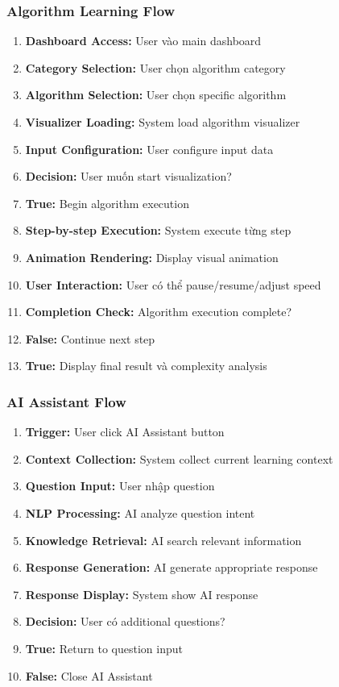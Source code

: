 \subsubsection{Algorithm Learning Flow}
\begin{enumerate}
    \item \textbf{Dashboard Access:} User vào main dashboard
    \item \textbf{Category Selection:} User chọn algorithm category
    \item \textbf{Algorithm Selection:} User chọn specific algorithm
    \item \textbf{Visualizer Loading:} System load algorithm visualizer
    \item \textbf{Input Configuration:} User configure input data
    \item \textbf{Decision:} User muốn start visualization?
    \item \textbf{True:} Begin algorithm execution
    \item \textbf{Step-by-step Execution:} System execute từng step
    \item \textbf{Animation Rendering:} Display visual animation
    \item \textbf{User Interaction:} User có thể pause/resume/adjust speed
    \item \textbf{Completion Check:} Algorithm execution complete?
    \item \textbf{False:} Continue next step
    \item \textbf{True:} Display final result và complexity analysis
\end{enumerate}

\subsubsection{AI Assistant Flow}
\begin{enumerate}
    \item \textbf{Trigger:} User click AI Assistant button
    \item \textbf{Context Collection:} System collect current learning context
    \item \textbf{Question Input:} User nhập question
    \item \textbf{NLP Processing:} AI analyze question intent
    \item \textbf{Knowledge Retrieval:} AI search relevant information
    \item \textbf{Response Generation:} AI generate appropriate response
    \item \textbf{Response Display:} System show AI response
    \item \textbf{Decision:} User có additional questions?
    \item \textbf{True:} Return to question input
    \item \textbf{False:} Close AI Assistant
\end{enumerate}

